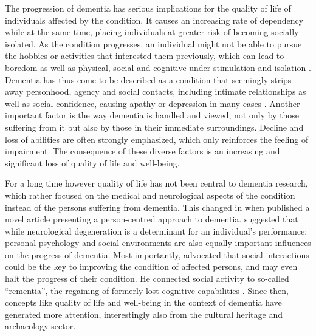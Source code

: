 The progression of dementia has serious implications for the quality of life of 
individuals affected by the condition. It causes an increasing rate of dependency 
while at the same time, placing individuals at greater risk of becoming socially isolated. 
As the condition progresses, an individual might not be able to pursue the hobbies or 
activities that interested them previously, which can lead to boredom as well as physical, 
social and cognitive under-stimulation and isolation \parencite{Society_2013}. 
Dementia has thus come to be described as a condition that seemingly strips away 
personhood, agency and social contacts, including intimate relationships as well as 
social confidence, causing apathy or depression in many cases \parencite[274,284]{Kitwood_1992}. 
Another important factor is the way dementia is handled and viewed, 
not only by those suffering from it but also by those in their immediate surroundings. 
Decline and loss of abilities are often strongly emphasized, which only reinforces the 
feeling of impairment. The consequence of these diverse factors is an increasing and
significant loss of quality of life and well-being.		
	
For a long time however quality of life has not been central to dementia research, 
which rather focused on the medical and neurological aspects of the condition instead 
of the persons suffering from dementia. This changed in \citeyear{Kitwood_1992} when \citeauthor{Kitwood_1992} published a novel article presenting a person-centred approach to dementia.
\citeauthor{Kitwood_1992}  suggested that while neurological degeneration is a determinant for an individual’s performance; 
personal psychology and social environments are also equally important influences on the progress of dementia. Most importantly, 
\citeauthor{Kitwood_1992}  advocated that social interactions could be the key to improving the condition of affected persons, and may even halt the progress of their condition. 
He connected social activity to so-called “rementia”, the regaining of formerly lost cognitive capabilities \parencite[271,280]{Kitwood_1992}. 
Since then, concepts like quality of life and well-being in the context of dementia have generated more attention, interestingly also from the cultural 
heritage and archaeology sector.	
	
	
